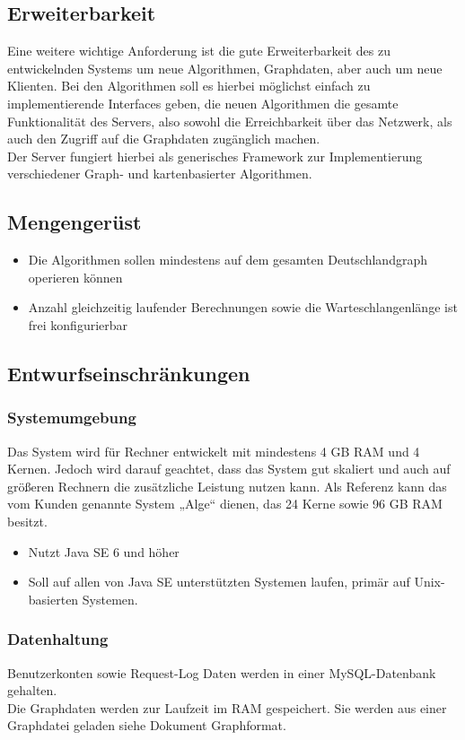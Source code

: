 \documentclass[a4paper,10pt,titlepage,parskip=true]{article}
\begin{document}
\subsection{Erweiterbarkeit}
Eine weitere wichtige Anforderung ist die gute Erweiterbarkeit des zu entwickelnden Systems um neue Algorithmen, Graphdaten, aber auch um neue Klienten.
Bei den Algorithmen soll es hierbei möglichst einfach zu implementierende Interfaces geben, die neuen Algorithmen die gesamte Funktionalität des Servers,
also sowohl die Erreichbarkeit über das Netzwerk, als auch den Zugriff auf die Graphdaten zugänglich machen.\\
Der Server fungiert hierbei als generisches Framework zur Implementierung verschiedener Graph- und kartenbasierter Algorithmen.
\subsection{Mengengerüst}
\label{Mengengeruest}

\begin{itemize}
 \item Die Algorithmen sollen mindestens auf dem gesamten Deutschlandgraph operieren können
 \item Anzahl gleichzeitig laufender Berechnungen sowie die Warteschlangenlänge ist frei konfigurierbar
\end{itemize}

\subsection{Entwurfseinschränkungen}
\subsubsection{Systemumgebung}
\label{Systemumgebung}
Das System wird für Rechner entwickelt mit mindestens 4 GB RAM und 4 Kernen. Jedoch wird darauf geachtet, dass das System gut skaliert und auch auf größeren Rechnern die zusätzliche Leistung nutzen kann.
Als Referenz kann das vom Kunden genannte System „Alge“ dienen, das 24 Kerne sowie 96 GB RAM besitzt.

\begin {itemize}
 \item Nutzt Java SE 6 und höher
 \item Soll auf allen von Java SE unterstützten Systemen laufen, primär auf Unix-basierten Systemen.
\end {itemize}
\subsubsection{Datenhaltung}
\label{datenhaltung}
Benutzerkonten sowie Request-Log Daten werden in einer MySQL-Datenbank gehalten.\\
Die Graphdaten werden zur Laufzeit im RAM gespeichert. Sie werden aus einer Graphdatei geladen siehe Dokument Graphformat.
\end{document}
